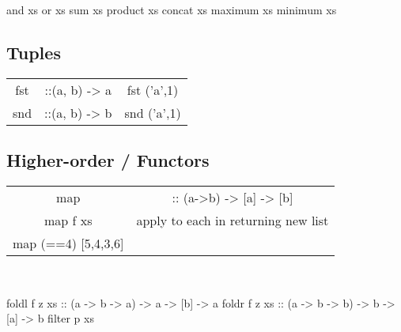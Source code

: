 \documentclass{refcard}
\begin{document}
\begin{ldesc}
	      and xs
	\li[or of booleans in \C{xs}]       or xs
	       sum xs
	   product xs
	 concat xs
	      maximum xs
	     minimum xs
\end{ldesc}


\subsection{Tuples}

\begin{tabular}{C@{\s}CC}
	fst  & ::\s{}(a, b) -> a     & fst ('a',1)  \\
	snd  & ::\s{}(a, b) -> b     & snd ('a',1)  \\
\end{tabular}


\subsection{Higher-order / Functors}

\begin{tabular}{C@{\s}C}
	map                 & :: (a->b) -> [a] -> [b] \\
	map f xs            & \textnormal{apply  to each  in  returning new list} \\
    map (==4) [5,4,3,6] &  \\

\end{tabular} \\
\newcommand{\emptyarray}{[]}
\begin{ldesc}
	   foldl f z xs \li
										\s\s\small{}:: (a -> b -> a) -> a -> [b] -> a
	   foldr f z xs \li
										\s\s\small{}:: (a -> b -> b) -> b -> [a] -> b
	  filter p xs \li
\end{ldesc}

\end{document}
